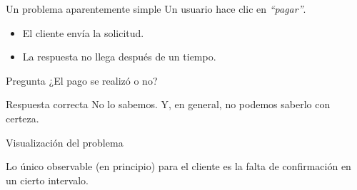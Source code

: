 \documentclass[institutional,screen,none]{ua-engineering-v6-beamer}
\begin{document}

\begin{frame}{Un problema aparentemente simple}
    Un usuario hace clic en \emph{“pagar”}.

    \begin{itemize}
        \item El cliente envía la solicitud.
        \item La respuesta no llega después de un tiempo.
    \end{itemize}

    \pause

    \begin{block}{Pregunta}
        ¿El pago se realizó o no?
    \end{block}

    \pause

    \begin{alertblock}{Respuesta correcta}
        No lo sabemos.
        Y, en general, no podemos saberlo con certeza.
    \end{alertblock}
\end{frame}

\begin{frame}{Visualización del problema}
    \begin{center}
    \end{center}

    \pause

    Lo único observable (en principio) para el cliente es la falta de confirmación en un cierto intervalo.
\end{frame}
\end{document}
